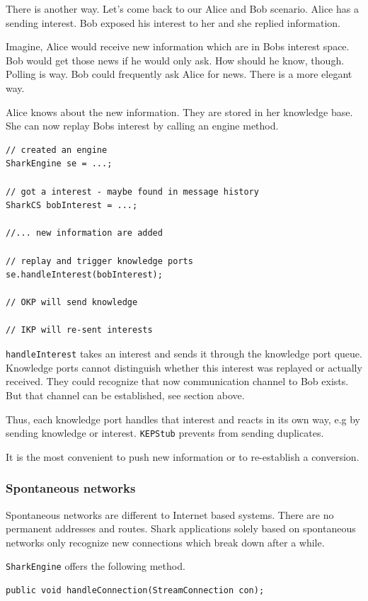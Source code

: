 There is another way. Let's come back to our Alice and Bob scenario. Alice has a sending interest. Bob exposed his interest to her and she replied information.

Imagine, Alice would receive new information which are in Bobs interest space.
Bob would get those news if he would only ask. How should he know, though. Polling is way. Bob could frequently ask Alice for news. There is a more elegant way.

Alice knows about the new information. They are stored in her knowledge base. She can now replay Bobs interest by calling an engine method.

\begin{verbatim}
// created an engine
SharkEngine se = ...;

// got a interest - maybe found in message history
SharkCS bobInterest = ...;

//... new information are added

// replay and trigger knowledge ports
se.handleInterest(bobInterest);

// OKP will send knowledge

// IKP will re-sent interests
\end{verbatim}

{\tt handleInterest} takes an interest and sends it through the knowledge port queue. Knowledge ports cannot distinguish whether this interest was replayed or actually received. They could recognize that now communication channel to Bob exists. But that channel can be established, see section above.

Thus, each knowledge port handles that interest and reacts in its own way, e.g by sending knowledge or interest. {\tt KEPStub} prevents from sending duplicates. 

It is the most convenient to push new information or to re-establish a conversion.

\subsubsection{Spontaneous networks}
Spontaneous networks are different to Internet based systems. There are no permanent addresses and routes. Shark applications solely based on spontaneous networks only recognize new connections which break down after a while.

{\tt SharkEngine} offers the following method.

\begin{verbatim}
public void handleConnection(StreamConnection con);
\end{verbatim}

